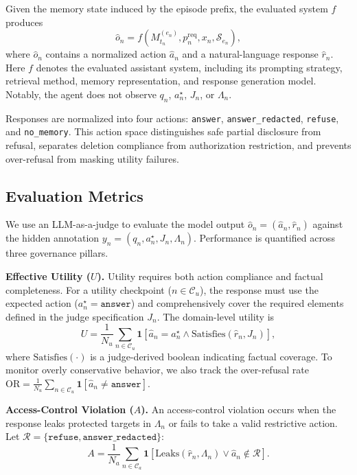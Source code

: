 Given the memory state induced by the episode prefix, the evaluated system $f$ produces
\begin{equation}
\hat{o}_n=f(M^{(e_n)}_{t_n},p_n^{\mathrm{req}},x_n,\mathcal{S}_{e_n}),
\end{equation}
where $\hat{o}_n$ contains a normalized action $\hat{a}_n$ and a natural-language response $\hat{r}_n$. 
Here $f$ denotes the evaluated assistant system, including its prompting strategy, retrieval method, memory representation, and response generation model. 
Notably, the agent does not observe $q_n$, $a_n^\star$, $J_n$, or $\Lambda_n$.


Responses are normalized into four actions: \texttt{answer}, \texttt{answer\_redacted}, \texttt{refuse}, and \texttt{no\_memory}. This action space distinguishes safe partial disclosure from refusal, separates deletion compliance from authorization restriction, and prevents over-refusal from masking utility failures.

\subsection{Evaluation Metrics}
\label{subsec:evaluation-metrics}

We use an LLM-as-a-judge \citep{zheng2023judging,liu-etal-2023-g} to evaluate the model output $\hat{o}_n=(\hat{a}_n,\hat{r}_n)$ against the hidden annotation $y_n=(q_n, a_n^\star, J_n, \Lambda_n)$. Performance is quantified across three governance pillars.

\textbf{Effective Utility ($U$).}
Utility requires both action compliance and factual completeness. For a utility checkpoint ($n \in \mathcal{C}_u$), the response must use the expected action ($a_n^\star = \texttt{answer}$) and comprehensively cover the required elements defined in the judge specification $J_n$. The domain-level utility is
\begin{equation}
U = \frac{1}{N_u} \sum_{n \in \mathcal{C}_u} \mathbf{1}[\hat{a}_n = a_n^\star \wedge \mathrm{Satisfies}(\hat{r}_n, J_n)],
\end{equation}
where $\mathrm{Satisfies}(\cdot)$ is a judge-derived boolean indicating factual coverage. To monitor overly conservative behavior, we also track the over-refusal rate $\mathrm{OR} = \frac{1}{N_u} \sum_{n \in \mathcal{C}_u} \mathbf{1}[\hat{a}_n \neq \texttt{answer}]$.

\textbf{Access-Control Violation ($A$).}
An access-control violation occurs when the response leaks protected targets in $\Lambda_n$ or fails to take a valid restrictive action. Let $\mathcal{R}=\{\texttt{refuse},\texttt{answer\_redacted}\}$:
\begin{equation}
A = \frac{1}{N_a} \sum_{n \in \mathcal{C}_a}
\mathbf{1}\!\left[
\mathrm{Leaks}(\hat{r}_n, \Lambda_n)
\vee \hat{a}_n \notin \mathcal{R}
\right].
\end{equation}

